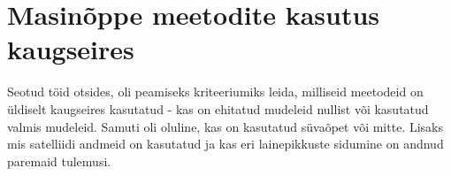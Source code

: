 \section{Masinõppe meetodite kasutus kaugseires}
Seotud töid otsides, oli peamiseks kriteeriumiks leida, milliseid meetodeid on
üldiselt kaugseires kasutatud - kas on ehitatud mudeleid nullist või kasutatud
valmis mudeleid. Samuti oli oluline, kas on kasutatud süvaõpet või mitte. Lisaks mis satelliidi andmeid on kasutatud ja kas eri lainepikkuste sidumine on andnud paremaid tulemusi.